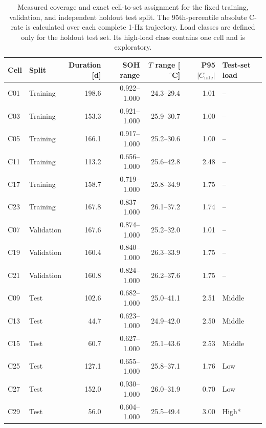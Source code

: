 \begin{table}[!htbp]
\centering
\footnotesize
\caption{Measured coverage and exact cell-to-set assignment for the fixed training, validation, and independent holdout test split. The 95th-percentile absolute C-rate is calculated over each complete 1-Hz trajectory. Load classes are defined only for the holdout test set. Its high-load class contains one cell and is exploratory.}
\label{tab:dataset_cell_split_coverage}
\setlength{\tabcolsep}{3pt}
\begin{tabular}{llrrrrl}
\toprule
Cell & Split & \shortstack{Duration\\\mbox{[d]}} & SOH range & \shortstack{$T$ range\\\mbox{[$^{\circ}$C]}} & \shortstack{P95\\$|C_{\mathrm{rate}}|$} & Test-set load \\
\midrule
C01 & Training & 198.6 & 0.922--1.000 & 24.3--29.4 & 1.01 & -- \\
C03 & Training & 153.3 & 0.921--1.000 & 25.9--30.7 & 1.00 & -- \\
C05 & Training & 166.1 & 0.917--1.000 & 25.2--30.6 & 1.00 & -- \\
C11 & Training & 113.2 & 0.656--1.000 & 25.6--42.8 & 2.48 & -- \\
C17 & Training & 158.7 & 0.719--1.000 & 25.8--34.9 & 1.75 & -- \\
C23 & Training & 167.8 & 0.837--1.000 & 26.1--37.2 & 1.74 & -- \\
\addlinespace[2pt]
C07 & Validation & 167.6 & 0.874--1.000 & 25.2--32.0 & 1.01 & -- \\
C19 & Validation & 160.4 & 0.840--1.000 & 26.3--33.9 & 1.75 & -- \\
C21 & Validation & 160.8 & 0.824--1.000 & 26.2--37.6 & 1.75 & -- \\
\addlinespace[2pt]
C09 & Test & 102.6 & 0.682--1.000 & 25.0--41.1 & 2.51 & Middle \\
C13 & Test & 44.7 & 0.623--1.000 & 24.9--42.0 & 2.50 & Middle \\
C15 & Test & 60.7 & 0.627--1.000 & 25.1--43.6 & 2.53 & Middle \\
C25 & Test & 127.1 & 0.655--1.000 & 25.8--37.1 & 1.76 & Low \\
C27 & Test & 152.0 & 0.930--1.000 & 26.0--31.9 & 0.70 & Low \\
C29 & Test & 56.0 & 0.604--1.000 & 25.5--49.4 & 3.00 & High* \\
\bottomrule
\end{tabular}
\end{table}
